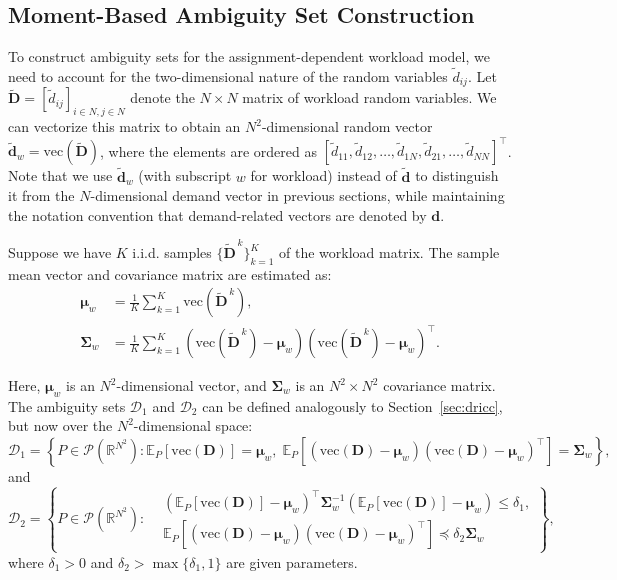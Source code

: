 \documentclass[preprint,12pt,authoryear]{elsarticle}
\begin{document}
\subsection{Moment-Based Ambiguity Set Construction}

To construct ambiguity sets for the assignment-dependent workload model, we need to account for the two-dimensional nature of the random variables $\tilde{d}_{ij}$. Let $\widetilde{\mathbf{D}} = [\tilde{d}_{ij}]_{i \in N, j \in N}$ denote the $N \times N$ matrix of workload random variables. We can vectorize this matrix to obtain an $N^2$-dimensional random vector $\widetilde{\mathbf{d}}_w = \text{vec}(\widetilde{\mathbf{D}})$, where the elements are ordered as $[\tilde{d}_{11}, \tilde{d}_{12}, \ldots, \tilde{d}_{1N}, \tilde{d}_{21}, \ldots, \tilde{d}_{NN}]^\top$. Note that we use $\widetilde{\mathbf{d}}_w$ (with subscript $w$ for workload) instead of $\widetilde{\mathbf{d}}$ to distinguish it from the $N$-dimensional demand vector in previous sections, while maintaining the notation convention that demand-related vectors are denoted by $\mathbf{d}$.

Suppose we have $K$ i.i.d. samples $\{ \widetilde{\mathbf{D}}^{\,k} \}_{k=1}^K$ of the workload matrix. The sample mean vector and covariance matrix are estimated as:
\begin{align}
\boldsymbol{\mu}_w &= \frac{1}{K} \sum_{k=1}^{K} \text{vec}(\widetilde{\mathbf{D}}^{\,k}), \\
\boldsymbol{\Sigma}_w &= \frac{1}{K} \sum_{k=1}^{K} (\text{vec}(\widetilde{\mathbf{D}}^{\,k}) - \boldsymbol{\mu}_w)(\text{vec}(\widetilde{\mathbf{D}}^{\,k}) - \boldsymbol{\mu}_w)^\top.
\end{align}

Here, $\boldsymbol{\mu}_w$ is an $N^2$-dimensional vector, and $\boldsymbol{\Sigma}_w$ is an $N^2 \times N^2$ covariance matrix. The ambiguity sets $\mathcal{D}_1$ and $\mathcal{D}_2$ can be defined analogously to Section~\ref{sec:dricc}, but now over the $N^2$-dimensional space:
\begin{equation}
\mathcal{D}_1 = \left\{ P \in \mathcal{P}(\mathbb{R}^{N^2}) : \mathbb{E}_P[\text{vec}(\mathbf{D})] = \boldsymbol{\mu}_w, \; \mathbb{E}_P[(\text{vec}(\mathbf{D}) - \boldsymbol{\mu}_w)(\text{vec}(\mathbf{D}) - \boldsymbol{\mu}_w)^\top] = \boldsymbol{\Sigma}_w \right\},
\end{equation}
and
\begin{equation}
\mathcal{D}_2 = \left\{ P \in \mathcal{P}(\mathbb{R}^{N^2}) :
\begin{aligned}
& (\mathbb{E}_P[\text{vec}(\mathbf{D})] - \boldsymbol{\mu}_w)^\top \boldsymbol{\Sigma}_w^{-1} (\mathbb{E}_P[\text{vec}(\mathbf{D})] - \boldsymbol{\mu}_w) \leqslant \delta_1, \\
& \mathbb{E}_P[(\text{vec}(\mathbf{D}) - \boldsymbol{\mu}_w)(\text{vec}(\mathbf{D}) - \boldsymbol{\mu}_w)^\top] \preceq \delta_2 \boldsymbol{\Sigma}_w
\end{aligned}
\right\},
\end{equation}
where $\delta_1 > 0$ and $\delta_2 > \max\{\delta_1, 1\}$ are given parameters.
\end{document}
